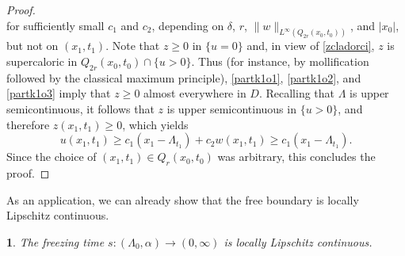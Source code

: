 \documentclass{article}
\numberwithin{equation}{section}
\numberwithin{figure}{section}
\theoremstyle{plain}
\theoremstyle{plain}
\theoremstyle{plain}
\newtheorem{cor}[thm]{\protect\corollaryname}
\theoremstyle{plain}
\theoremstyle{definition}
\theoremstyle{remark}
\providecommand{\corollaryname}{Corollary}
\begin{document}
\begin{proof}
\begin{equation}
\end{equation}
for sufficiently small $c_1$ and $c_2$, depending on $\delta$, $r$, $\|w\|_{L^\infty(Q_{2r}(x_0,t_0))}$, and $|x_0|$, but not on $(x_1,t_1)$. Note that  $z\geq0$ in $\{u=0\}$ and, in view of \eqref{zcladorci}, $z$ is supercaloric in $Q_{2r}(x_0,t_0)\cap\{u>0\}.$ Thus (for instance, by mollification followed by the classical maximum principle), \eqref{partk1o1}, \eqref{partk1o2}, and \eqref{partk1o3} imply that $z\geq0$ almost everywhere in $D$. Recalling that $\Lambda$ is upper semicontinuous, it follows that $z$ is upper semicontinuous in $\{u>0\}$, and therefore $z(x_1,t_1)\geq 0$, which yields
\[u(x_1,t_1)\geq c_1(x_1-\Lambda_{t_1})+c_2w(x_1,t_1)\geq c_1(x_1-\Lambda_{t_1}).\]
Since the choice of $(x_1,t_1)\in Q_{r}(x_0,t_0)$ was arbitrary, this concludes the proof.
\end{proof}
As an application, we can already show that the free boundary is locally Lipschitz continuous.
\begin{cor} The freezing time $s:(\Lambda_0,\alpha)\to (0,\infty)$ is locally Lipschitz continuous.
\end{cor} 
\end{document}
